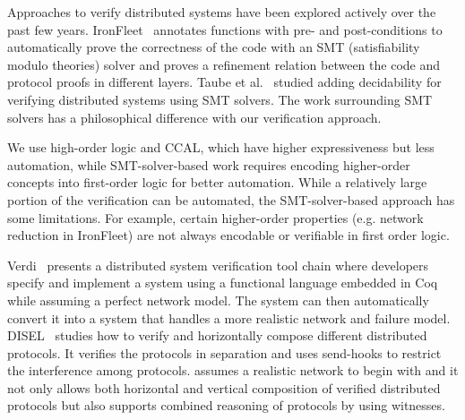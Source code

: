 \vspace{-0.2em}

Approaches to verify distributed systems have been explored actively over the
past few years. IronFleet~\cite{ironfleet} annotates functions with pre- and
post-conditions to automatically prove the correctness of the code with an SMT (satisfiability
modulo theories) solver and proves a refinement relation between the code and
protocol proofs in different layers. Taube et al.~\cite{modular} studied adding
decidability for verifying distributed systems using SMT solvers.
The work surrounding SMT solvers has a philosophical difference with our verification approach.
We use high-order logic and CCAL, which have higher expressiveness but less automation,
while SMT-solver-based work requires encoding higher-order concepts into
first-order logic for better automation. While a relatively large portion of the
verification can be automated, the SMT-solver-based approach has some limitations.
For example, certain higher-order properties (e.g. network reduction
in IronFleet) are not always encodable or verifiable in first order logic.

Verdi~\cite{verdi} presents a distributed system verification tool chain
where developers specify and implement a system using a functional language
embedded in Coq while assuming a perfect network model. The system can then automatically convert
it into a system that handles a more realistic network and failure model. DISEL~\cite{disel}
studies how to verify and horizontally compose different distributed protocols.
It verifies the protocols in separation and uses send-hooks to restrict the
interference among protocols. \sysname{} assumes a realistic network to begin with
and it not only allows both horizontal and vertical composition of verified distributed
protocols but also supports combined reasoning of protocols by using witnesses.
\vspace{-0.2em}

